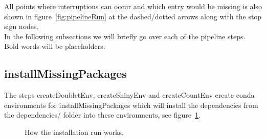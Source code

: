 All points where interruptions can occur and which entry would be missing is also shown in figure~\ref{fig:pipelineRun} at the dashed/dotted arrows along with the stop sign nodes.\\

In the following subsections we will briefly go over each of the pipeline steps. Bold words will be placeholders.

\subsection{installMissingPackages}
The steps createDoubletEnv, createShinyEnv and createCountEnv create conda environments for installMissingPackages which will install the dependencies from the dependencies/ folder into these environments, see figure~\ref{fig:installRun}.

\begin{figure}[h!]
	\centering
	\caption{How the installation run works.}
	\label{fig:installRun}
\end{figure}
 

